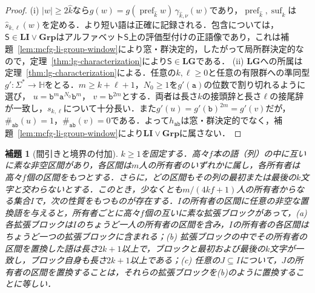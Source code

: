 \documentclass[11pt,a4paper]{ltjsarticle}
\numberwithin{equation}{section}
\theoremstyle{plain}
\newtheorem{lemma}[theorem]{補題}
\theoremstyle{definition}
\theoremstyle{remark}
\begin{document}
\begin{proof}
(i) $|w|\ge2\hat k$なら$g(w)=g(\operatorname{pref}_{\hat k}w)\,\gamma_{\hat k,\nu}(w)$であり，$\operatorname{pref}_{\hat k},\operatorname{suf}_{\hat k}$は$\widehat s_{k,\ell}(w)$を定める．より短い語は正確に記録される．包含については，$\mathsf S\in\mathbf{LI}\vee\mathbf{Grp}$はアルファベット$\mathsf S$上の評価型付けの正語像であり，これは補題~\ref{lem:mcfg-li-group-window}により窓・群決定的，したがって局所群決定的なので，定理~\ref{thm:lg-characterization}により$\mathsf S\in\mathbf{LG}$である．
(ii) $\mathbf{LG}$への所属は定理~\ref{thm:lg-characterization}による．任意の$k,\ell\ge0$と任意の有限群への準同型$g':\Sigma^*\to {\mathbb H}$をとる．$m\ge k+\ell+1$，$N_0\ge1$を$g'(\mathtt a)$の位数で割り切れるように選び，
$u=\mathtt b^m\mathtt a^{N_0}\mathtt b^m$，
$v=\mathtt b^{2m}$とする．両者は長さ$k$の接頭辞と長さ$\ell$の接尾辞が一致し，$s_{k,\ell}$について十分長い．また$g'(u)=g'(\mathtt b)^{2m}=g'(v)$だが，$\#_{\mathtt{ab}}(u)=1$，$\#_{\mathtt{ab}}(v)=0$である．よって$h_{\mathtt{ab}}$は窓・群決定的でなく，補題~\ref{lem:mcfg-li-group-window}により$\mathbf{LI}\vee\mathbf{Grp}$に属さない．
\end{proof}

\begin{lemma}[間引きと境界の付加]
\label{lem:lg-buffered-owners}
$k\ge1$を固定する．高々$f$本の語（\emph{列}）の中に互いに素な非空区間があり，各区間は$m$人の所有者のいずれかに属し，各所有者は高々$f$個の区間をもつとする．さらに，どの区間もその列の最初または最後の$k$文字と交わらないとする．このとき，少なくとも$m/(4kf+1)$人の所有者からなる集合$I$で，次の性質をもつものが存在する．$I$の所有者の区間に任意の非空な置換語を与えると，所有者ごとに高々$f$個の互いに素な\emph{拡張ブロック}があって，\textup{(a)} 各拡張ブロックは$I$のちょうど一人の所有者の区間を含み，$I$の所有者の各区間はちょうど一つの拡張ブロックに含まれる；\textup{(b)} 拡張ブロックの中でその所有者の区間を置換した語は長さ$2k+1$以上で，ブロックと最初および最後の$k$文字が一致し，ブロック自身も長さ$2k+1$以上である；\textup{(c)} 任意の$J\subseteq I$について，$J$の所有者の区間を置換することは，それらの拡張ブロックを(b)のように置換することに等しい．
\end{lemma}
\end{document}
